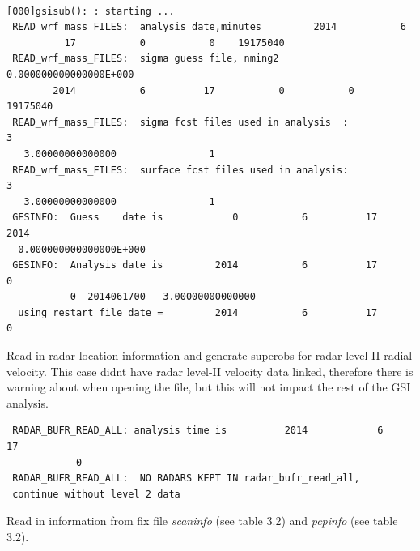 \begin{scriptsize}
\begin{verbatim}
   
[000]gsisub(): : starting ...
 READ_wrf_mass_FILES:  analysis date,minutes         2014           6
          17           0           0    19175040
 READ_wrf_mass_FILES:  sigma guess file, nming2   0.000000000000000E+000
        2014           6          17           0           0    19175040
 READ_wrf_mass_FILES:  sigma fcst files used in analysis  :             3
   3.00000000000000                1
 READ_wrf_mass_FILES:  surface fcst files used in analysis:             3
   3.00000000000000                1
 GESINFO:  Guess    date is            0           6          17        2014
  0.000000000000000E+000
 GESINFO:  Analysis date is         2014           6          17           0
           0  2014061700   3.00000000000000
  using restart file date =         2014           6          17           0
\end{verbatim}
\end{scriptsize}
Read in radar location information and generate superobs for radar level-II radial velocity. This case didn\textquotesingle t have radar level-II velocity data linked, therefore there is warning about when opening the file, but this will not impact the rest of the GSI analysis.
\begin{scriptsize}
\begin{verbatim}
 RADAR_BUFR_READ_ALL: analysis time is          2014            6           17
            0
 RADAR_BUFR_READ_ALL:  NO RADARS KEPT IN radar_bufr_read_all,
 continue without level 2 data
\end{verbatim}
\end{scriptsize}

Read in information from fix file \textit{scaninfo} (see table 3.2) and \textit{pcpinfo} (see table 3.2). 

